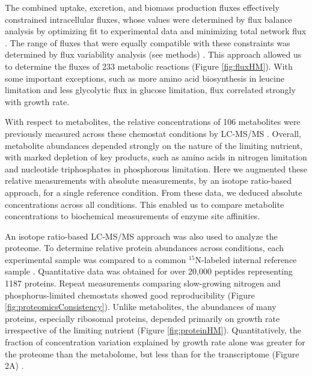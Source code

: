The combined uptake, excretion, and biomass production fluxes effectively constrained intracellular fluxes, whose values were determined by flux balance analysis by optimizing fit to experimental data and minimizing total network flux \cite{Herrgard:2008gb, Yizhak:2010jk}. The range of fluxes that were equally compatible with these constraints was determined by flux variability analysis (see methods) \cite{Mahadevan:2003wq}. This approach allowed us to determine the fluxes of 233 metabolic reactions (Figure \ref{fig:fluxHM}). With some important exceptions, such as more amino acid biosynthesis in leucine limitation and less glycolytic flux in glucose limitation, flux correlated strongly with growth rate.

With respect to metabolites, the relative concentrations of 106 metabolites were previously measured across these chemostat conditions by LC-MS/MS \cite{Boer:2010fb}. Overall, metabolite abundances depended strongly on the nature of the limiting nutrient, with marked depletion of key products, such as amino acids in nitrogen limitation and nucleotide triphosphates in phosphorous limitation. Here we augmented these relative measurements with absolute measurements, by an isotope ratio-based approach, for a single reference condition. From these data, we deduced absolute concentrations across all conditions. This enabled us to compare metabolite concentrations to biochemical measurements of enzyme site affinities.

An isotope ratio-based LC-MS/MS approach was also used to analyze the proteome. To determine relative protein abundances across conditions, each experimental sample was compared to a common $^{15}$N-labeled internal reference sample \cite{Oda:1999uz,Ong:2002tf}. Quantitative data was obtained for over 20,000 peptides representing 1187 proteins. Repeat measurements comparing slow-growing nitrogen and phosphorus-limited chemostats showed good reproducibility (Figure \ref{fig:proteomicsConsistency}). Unlike metabolites, the abundances of many proteins, especially ribosomal proteins, depended primarily on growth rate irrespective of the limiting nutrient (Figure \ref{fig:proteinHM}). Quantitatively, the fraction of concentration variation explained by growth rate alone was greater for the proteome than the metabolome, but less than for the transcriptome (Figure 2A) \cite{Brauer:2008jn}. 

